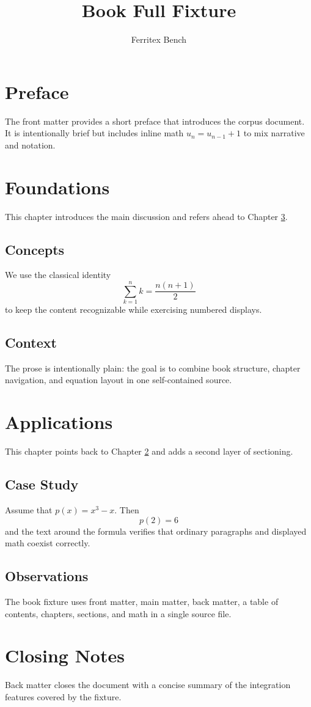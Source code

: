 \documentclass{book}
\title{Book Full Fixture}
\author{Ferritex Bench}
\begin{document}
\frontmatter
\maketitle
\tableofcontents

\chapter{Preface}
The front matter provides a short preface that introduces the corpus document. It is intentionally brief but includes inline math $u_n = u_{n-1} + 1$ to mix narrative and notation.

\mainmatter
\chapter{Foundations}\label{chap:foundations}
This chapter introduces the main discussion and refers ahead to Chapter \ref{chap:applications}.

\section{Concepts}
We use the classical identity
\begin{equation}
\sum_{k=1}^{n} k = \frac{n(n+1)}{2}
\end{equation}
to keep the content recognizable while exercising numbered displays.

\section{Context}
The prose is intentionally plain: the goal is to combine book structure, chapter navigation, and equation layout in one self-contained source.

\chapter{Applications}\label{chap:applications}
This chapter points back to Chapter \ref{chap:foundations} and adds a second layer of sectioning.

\section{Case Study}
Assume that $p(x) = x^3 - x$. Then
\[
p(2) = 6
\]
and the text around the formula verifies that ordinary paragraphs and displayed math coexist correctly.

\section{Observations}
The book fixture uses front matter, main matter, back matter, a table of contents, chapters, sections, and math in a single source file.

\backmatter
\chapter{Closing Notes}
Back matter closes the document with a concise summary of the integration features covered by the fixture.
\end{document}
